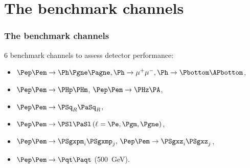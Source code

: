 \documentclass{beamer}
\begin{document}
\section[Benchmarks]{The benchmark channels}
\begin{frame}
\frametitle{The benchmark channels}
6 benchmark channels to assess detector performance:
\begin{itemize}
\item $\Pep\Pem \to \Ph \Pgne \Pagne, \Ph \to \mu^+\mu^-, \Ph \to
\Pbottom\APbottom$,
\item  $\Pep\Pem \to \PHp \PHm$, $\Pep\Pem \to \PHz \PA$, 
\item $\Pep\Pem \to \PSq_R \PaSq_R$, 
\item $\Pep\Pem \to \PSl \PaSl \,(\ell = \Pe,\Pgm,\Pgne)$, 
\item $\Pep\Pem \to \PSgxpm_i \PSgxmp_j,\, \Pep\Pem \to \PSgxz_i \PSgxz_j$,
\item  $\Pep\Pem \to \Pqt \Paqt$ (500~GeV).
\end{itemize}
\end{frame}
\end{document}
